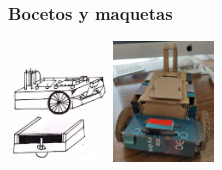 \documentclass{beamer}
\begin{document}
\begin{frame}
\begin{columns}
\begin{column}{0.5\textwidth}
		\end{column}
	\end{columns}

\end{frame}

\begin{frame}
	\frametitle{Bocetos y maquetas}
	\begin{center}
		\includegraphics[width=0.2\textwidth]{figs/boceto_papel.jpeg} \hspace{0.5cm}
		\includegraphics[width=0.2\textwidth]{figs/boceto_carton5.jpeg}
	\end{center}


\end{frame}
\end{document}
